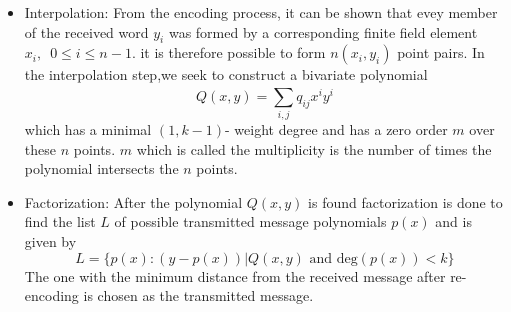 \documentclass[fontsize=12pt]{article}
\begin{document}
\begin{itemize}
\item Interpolation: From the encoding process, it can be shown that evey member of the received word $y_i$ was formed by a corresponding finite field element $x_i,\,\,\, 0\leq i \leq n-1$. it is therefore possible to form $n (x_i,y_i)$ point pairs. In the interpolation step,we seek to construct a bivariate polynomial 
\begin{equation}
Q(x,y)= \sum_{i,j}^{}q_{ij}x^iy^i
\end{equation}
which has a minimal $(1,k-1)$- weight degree and has a zero order $m$ over these $n$ points. $m$ which is called the multiplicity is the number of times the polynomial intersects the $n$ points.
\item Factorization: After the polynomial $Q(x,y)$ is found factorization is done to find the list $L$ of possible transmitted message polynomials $p(x)$ and is given by
\begin{equation}L= \{p(x):(y-p(x)) | Q(x,y) \text{ and }  \text{deg}(p(x)) < k \}\end{equation} The one with the minimum distance from the received message after re-encoding is chosen as the transmitted message.
\end{itemize}
\end{document}
